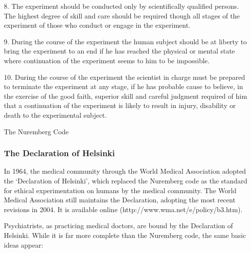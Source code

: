 {{8.  The experiment should be conducted only by scientifically qualified persons. The highest degree of skill and care should be required though all stages of the experiment of those who conduct or engage in the experiment.

9.  During the course of the experiment the human subject should be at liberty to bring the experiment to an end if he has reached the physical or mental state where continuation of the experiment seems to him to be impossible.

10. During the course of the experiment the scientist in charge must be prepared to terminate the experiment at any stage, if he has probable cause to believe, in the exercise of the good faith, superior skill and careful judgment required of him that a continuation of the experiment is likely to result in injury, disability or death to the experimental subject.
}} 

The Nuremberg Code

\subsubsection{The Declaration of Helsinki}
\label{thedeclarationofhelsinki}

In 1964, the medical community through the World Medical Association adopted the `Declaration of Helsinki', which replaced the Nuremberg code as the standard for ethical experimentation on humans by the medical community. The World Medical Association still maintains the Declaration, adopting the most recent revisions in 2004. It is available online (http:\slash \slash www.wma.net\slash e\slash policy\slash b3.htm).

Psychiatrists, as practicing medical doctors, are bound by the Declaration of Helsinki. While it is far more complete than the Nuremberg code, the same basic ideas appear:

